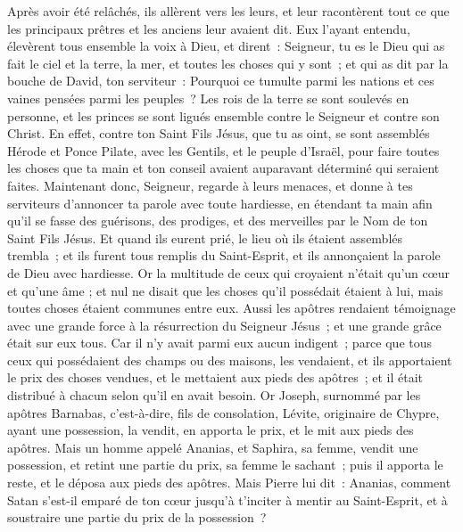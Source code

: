 \begin{multicols}{2}
Après avoir été relâchés, ils allèrent vers les leurs, et leur racontèrent tout ce que les principaux prêtres et les anciens leur avaient dit.
Eux l'ayant entendu, élevèrent tous ensemble la voix à Dieu, et dirent~: Seigneur, tu es le Dieu qui as fait le ciel et la terre, la mer, et toutes les choses qui y sont~;
et qui as dit par la bouche de David, ton serviteur~: Pourquoi ce tumulte parmi les nations et ces vaines pensées parmi les peuples~?
Les rois de la terre se sont soulevés en personne, et les princes se sont ligués ensemble contre le Seigneur et contre son Christ.
En effet, contre ton Saint Fils Jésus, que tu as oint, se sont assemblés Hérode et Ponce Pilate, avec les Gentils, et le peuple d'Israël,
pour faire toutes les choses que ta main et ton conseil avaient auparavant déterminé qui seraient faites. 
Maintenant donc, Seigneur, regarde à leurs menaces, et donne à tes serviteurs d'annoncer ta parole avec toute hardiesse,
en étendant ta main afin qu'il se fasse des guérisons, des prodiges, et des merveilles par le Nom de ton Saint Fils Jésus.
Et quand ils eurent prié, le lieu où ils étaient assemblés trembla~; et ils furent tous remplis du Saint-Esprit, et ils annonçaient la parole de Dieu avec hardiesse.
Or la multitude de ceux qui croyaient n'était qu'un cœur et qu'une âme ; et nul ne disait que les choses qu'il possédait étaient à lui, mais toutes choses étaient communes entre eux.
Aussi les apôtres rendaient témoignage avec une grande force à la résurrection du Seigneur Jésus~; et une grande grâce était sur eux tous.
Car il n'y avait parmi eux aucun indigent~; parce que tous ceux qui possédaient des champs ou des maisons, les vendaient, et ils apportaient le prix des choses vendues,
et le mettaient aux pieds des apôtres~; et il était distribué à chacun selon qu'il en avait besoin.
Or Joseph, surnommé par les apôtres Barnabas, c'est-à-dire, fils de consolation, Lévite, originaire de Chypre,
ayant une possession, la vendit, en apporta le prix, et le mit aux pieds des apôtres.
\VerseOne{}Mais un homme appelé Ananias, et Saphira, sa femme, vendit une possession,
et retint une partie du prix, sa femme le sachant~; puis il apporta le reste, et le déposa aux pieds des apôtres.
Mais Pierre lui dit~: Ananias, comment Satan s'est-il emparé de ton cœur jusqu'à t'inciter à mentir au Saint-Esprit, et à soustraire une partie du prix de la possession~?

\end{multicols}
